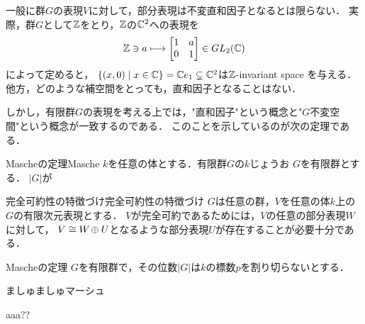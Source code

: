 \documentclass[a4paper,thmnumbering=section,eqnumbering=section]{summary-ja}
\begin{document}
\vspace{1em}一般に群$G$の表現$V$に対して，部分表現は不変直和因子となるとは限らない．
実際，群$G$として$\mathbb{Z}$をとり，$\mathbb{Z}$の$\mathbb{C}^2$への表現を
\[
    \mathbb{Z} \ni a \longmapsto 
    \begin{bmatrix}
        1 & a \\
        0 & 1 \\
    \end{bmatrix} \in GL_2(\mathbb{C})
\]によって定めると，
$\left\{
    (x,0) \;\middle|\; x\in \mathbb{C}
\right\} = \mathbb{C} e_1 \subsetneq  \mathbb{C}^2$は$\mathbb{Z}$-invariant space を与える．
他方，どのような補空間をとっても，直和因子となることはない．\par
しかし，有限群$G$の表現を考える上では，"直和因子"という概念と"$G$不変空間"という概念が一致するのである．
このことを示しているのが次の定理である．
\begin{theorem}{Mascheの定理}{Masche}
    $k$を任意の体とする．有限群$G$の$k$じょうお
    $G$を有限群とする．
    $|G|$が
\end{theorem}

\begin{lemma}{完全可約性の特徴づけ}{完全可約性の特徴づけ}\quad
    $G$は任意の群，$V$を任意の体$k$上の$G$の有限次元表現とする．
    $V$が完全可約であるためには，$V$の任意の部分表現$W$に対して，
    $V\cong W\hspace{-1pt}\oplus U$となるような部分表現$U$が存在することが必要十分である．
\end{lemma}\vspace{-1em}
\begin{myproof} \color{red}{まず，$V$の有限次元性から，$V$の直和因子は（存在すれば）有限個であることに注意する．$\dim_k V$による
    帰納法によって示す．\par 
    まず$V$が完全可約で，既約成分$V_1,\cdots, V_r$によって
    $V \cong V_1 \oplus \cdots \oplus V_r$と表せるとする．$\dim_k =1$のときには明らかである．$\dim_k V>1$として，
    $W$を$V$の自明でない部分表現とする．このとき
    $(W\cap V_1) \oplus \cdots \oplus (W\cap V_r)$は$W$の直和分解であり，}
\end{myproof}


\begin{theorem}{Mascheの定理}{}
    $G$を有限群で，その位数$|G|$は$k$の標数$p$を割り切らないとする．
\end{theorem}
ましゅましゅマーシュ
\begin{myproof}
    aaa??
\end{myproof}
\end{document}
